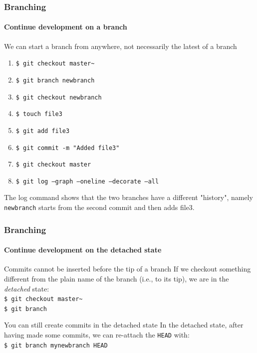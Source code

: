 \begin{frame}
\frametitle{Branching}
\framesubtitle{Continue development on a branch}

\begin{block}{We can start a branch from anywhere, not necessarily the latest of a branch}
\begin{enumerate}
\item \texttt{\$ git checkout master\textasciitilde{}} \\
\item \texttt{\$ git branch newbranch} \\
\item \texttt{\$ git checkout newbranch} \\
\item \texttt{\$ touch file3} \\
\item \texttt{\$ git add file3} \\
\item \texttt{\$ git commit -m "Added file3"} \\
\item \texttt{\$ git checkout master} \\
\item \texttt{\$ git log ---graph ---oneline ---decorate --all}
\end{enumerate}

The log command shows that the two branches have a different "history", namely \texttt{newbranch} starts from the second commit and then adds file3.
\end{block}
\end{frame}

\begin{frame}
\frametitle{Branching}
\framesubtitle{Continue development on the detached state}

\begin{block}{Commits cannot be inserted before the tip of a branch}
If we checkout something different from the plain name of the branch (i.e., to its tip), we are in the {\em detached} state: \\
\texttt{\$ git checkout master\textasciitilde{}} \\
\texttt{\$ git branch}
\end{block}
\pause
\begin{block}{You can still create commits in the detached state}
In the detached state, after having made some commits, we can re-attach the \texttt{HEAD} with: \\
\texttt{\$ git branch mynewbranch HEAD}
\end{block}

\end{frame}

